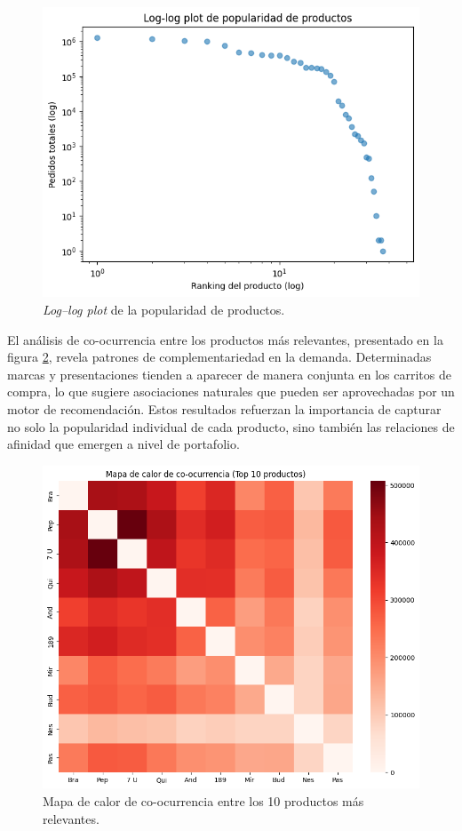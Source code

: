 \begin{figure}[htpb]
	\centering
	\includegraphics[scale=.6]{./Figures/log_log_plot.png}
	\caption{\textit{Log–log plot} de la popularidad de productos.}
	\label{fig:log_log_plot}
\end{figure}

El análisis de co-ocurrencia entre los productos más relevantes, presentado en la figura \ref{fig:heatmap_coocurrencia}, revela patrones de complementariedad en la demanda. Determinadas marcas y presentaciones tienden a aparecer de manera conjunta en los carritos de compra, lo que sugiere asociaciones naturales que pueden ser aprovechadas por un motor de recomendación. Estos resultados refuerzan la importancia de capturar no solo la popularidad individual de cada producto, sino también las relaciones de afinidad que emergen a nivel de portafolio.

\begin{figure}[htpb]
	\centering
	\includegraphics[scale=.45]{./Figures/heatmap_coocurrencia.png}
	\caption{Mapa de calor de co-ocurrencia entre los 10 productos más relevantes.}
	\label{fig:heatmap_coocurrencia}
\end{figure}

